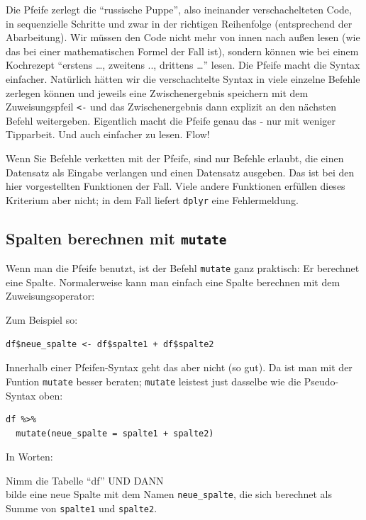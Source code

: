 \documentclass[12pt,ngerman,]{book}
\theoremstyle{definition}
\theoremstyle{definition}
\theoremstyle{remark}
\let\BeginKnitrBlock\begin \let\EndKnitrBlock\end
\begin{document}
Die Pfeife zerlegt die ``russische Puppe'', also ineinander
verschachelteten Code, in sequenzielle Schritte und zwar in der
richtigen Reihenfolge (entsprechend der Abarbeitung). Wir müssen den
Code nicht mehr von innen nach außen lesen (wie das bei einer
mathematischen Formel der Fall ist), sondern können wie bei einem
Kochrezept ``erstens \ldots{}, zweitens .., drittens \ldots{}'' lesen.
Die Pfeife macht die Syntax einfacher. Natürlich hätten wir die
verschachtelte Syntax in viele einzelne Befehle zerlegen können und
jeweils eine Zwischenergebnis speichern mit dem Zuweisungspfeil
\texttt{\textless{}-} und das Zwischenergebnis dann explizit an den
nächsten Befehl weitergeben. Eigentlich macht die Pfeife genau das - nur
mit weniger Tipparbeit. Und auch einfacher zu lesen. Flow!

\BeginKnitrBlock{rmdcaution}
Wenn Sie Befehle verketten mit der Pfeife, sind nur Befehle erlaubt, die
einen Datensatz als Eingabe verlangen und einen Datensatz ausgeben. Das
ist bei den hier vorgestellten Funktionen der Fall. Viele andere
Funktionen erfüllen dieses Kriterium aber nicht; in dem Fall liefert
\texttt{dplyr} eine Fehlermeldung.
\EndKnitrBlock{rmdcaution}

\subsection{\texorpdfstring{Spalten berechnen mit
\texttt{mutate}}{Spalten berechnen mit mutate}}\label{spalten-berechnen-mit-mutate}

Wenn man die Pfeife benutzt, ist der Befehl
\texttt{mutate} ganz praktisch: Er berechnet eine
Spalte. Normalerweise kann man einfach eine Spalte berechnen mit dem
Zuweisungsoperator:

Zum Beispiel so:

\begin{verbatim}
df$neue_spalte <- df$spalte1 + df$spalte2
\end{verbatim}

Innerhalb einer Pfeifen-Syntax geht das aber nicht (so gut). Da ist man
mit der Funtion \texttt{mutate} besser beraten; \texttt{mutate} leistest
just dasselbe wie die Pseudo-Syntax oben:

\begin{verbatim}
df %>% 
  mutate(neue_spalte = spalte1 + spalte2)
\end{verbatim}

In Worten:

\BeginKnitrBlock{rmdpseudocode}
Nimm die Tabelle ``df'' UND DANN\\
bilde eine neue Spalte mit dem Namen \texttt{neue\_spalte}, die sich
berechnet als Summe von \texttt{spalte1} und \texttt{spalte2}.
\EndKnitrBlock{rmdpseudocode}
\end{document}
